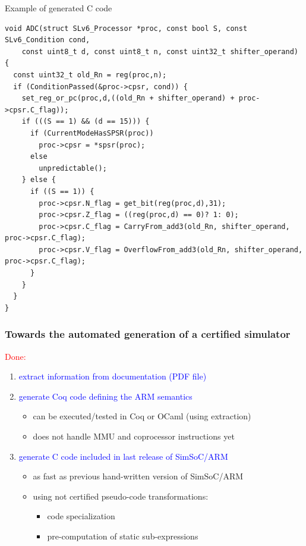 \documentclass{beamer}
\newenvironment{f}[1]{\begin{frame}\frametitle{#1}}{\end{frame}}
\renewenvironment{i}{\begin{itemize}}{\end{itemize}}
\newenvironment{e}{\begin{enumerate}}{\end{enumerate}}
\newcommand\red{\textcolor{red}}
\newcommand\blue{\textcolor{blue}}
\begin{document}

\begin{frame}[fragile]{Example of generated C code}

{\small\begin{verbatim}
void ADC(struct SLv6_Processor *proc, const bool S, const SLv6_Condition cond,
    const uint8_t d, const uint8_t n, const uint32_t shifter_operand)
{
  const uint32_t old_Rn = reg(proc,n);
  if (ConditionPassed(&proc->cpsr, cond)) {
    set_reg_or_pc(proc,d,((old_Rn + shifter_operand) + proc->cpsr.C_flag));
    if (((S == 1) && (d == 15))) {
      if (CurrentModeHasSPSR(proc))
        proc->cpsr = *spsr(proc);
      else
        unpredictable();
    } else {
      if ((S == 1)) {
        proc->cpsr.N_flag = get_bit(reg(proc,d),31);
        proc->cpsr.Z_flag = ((reg(proc,d) == 0)? 1: 0);
        proc->cpsr.C_flag = CarryFrom_add3(old_Rn, shifter_operand, proc->cpsr.C_flag);
        proc->cpsr.V_flag = OverflowFrom_add3(old_Rn, shifter_operand, proc->cpsr.C_flag);
      }
    }
  }
}
\end{verbatim}}

\end{frame}


\begin{f}{Towards the automated generation of a certified simulator}

\red{Done:}

\begin{e}\itemsep+3mm
\item
\blue{extract information from documentation (PDF file)}
\item
\blue{generate Coq code defining the ARM semantics}
\begin{i}
\item can be executed/tested in Coq or OCaml (using extraction)
\item does not handle MMU and coprocessor instructions yet
\end{i}
\item
\blue{generate C code included in last release of SimSoC/ARM}
\begin{i}
\item
as fast as previous hand-written version of SimSoC/ARM
\item
using not certified pseudo-code transformations:
\begin{i}
\item code specialization
\item pre-computation of static sub-expressions 
\end{i}
\end{i}
\end{e}

\end{f}
\end{document}
